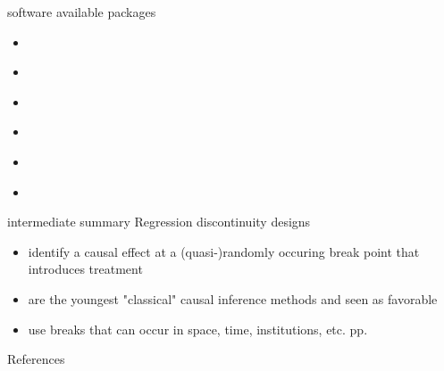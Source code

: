 \documentclass[aspectratio=169]{beamer}
\begin{document}
		\begin{frame}{software}
			available packages
			\begin{itemize}
				\item \href{https://cran.r-project.org/web/packages/rdd/}{\underline{}}
				\item \href{https://rdpackages.github.io/}{\underline{}}
				\item \href{https://rdpackages.github.io/}{\underline{}}
				\item \href{https://rdpackages.github.io/}{\underline{}}
				\item \href{https://rdpackages.github.io/}{\underline{}}
				\item \href{https://rdpackages.github.io/}{\underline{}}
			\end{itemize}
		\end{frame}

		\begin{frame}{intermediate summary}
			Regression discontinuity designs \\ \vspace*{.5cm}
			\begin{itemize}
				\item identify a causal effect at a (quasi-)randomly occuring break point that introduces treatment
				\item are the youngest "classical" causal inference methods and seen as favorable
				\item use breaks that can occur in space, time, institutions, etc. pp.
			\end{itemize}
		\end{frame}

	\begin{frame}[t, allowframebreaks]{References}
	  \printbibliography
	\end{frame}
\end{document}
